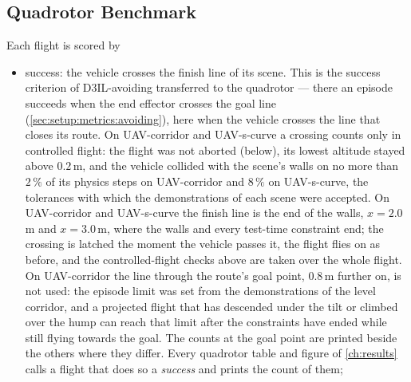 \subsection{Quadrotor Benchmark}\label{sec:setup:metrics:uav}

Each flight is scored by
\begin{itemize}
  \item success: the vehicle crosses the finish line of its scene. This is the success
    criterion of D3IL-avoiding transferred to the quadrotor --- there an episode succeeds when the end effector
    crosses the goal line (\autoref{sec:setup:metrics:avoiding}), here when the vehicle crosses the line
    that closes its route. On UAV-corridor and UAV-s-curve a crossing counts only in controlled flight: the
    flight was not aborted (below), its lowest altitude stayed above $0.2$\,m, and the vehicle collided with
    the scene's walls on no more than $2\,\%$ of its physics steps on UAV-corridor and $8\,\%$ on
    UAV-s-curve, the tolerances with which the demonstrations of each scene were accepted. On UAV-corridor
    and UAV-s-curve the finish line is the end of the walls, $x=2.0$\,m and $x=3.0$\,m, where the walls and
    every test-time constraint end; the crossing is latched the moment the vehicle passes it, the flight flies
    on as before, and the controlled-flight checks above are taken over the whole flight. On
    UAV-corridor the line through the route's goal point, $0.8$\,m further on, is not used: the episode limit was set from the
    demonstrations of the level corridor, and a projected flight that has descended under the tilt or climbed
    over the hump can reach that limit after the constraints have ended while still flying towards the goal.
    The counts at the goal point are printed beside the others where they differ. Every quadrotor
    table and figure of \autoref{ch:results} calls a flight that does so a \emph{success} and prints the
    count of them;

\end{itemize}
